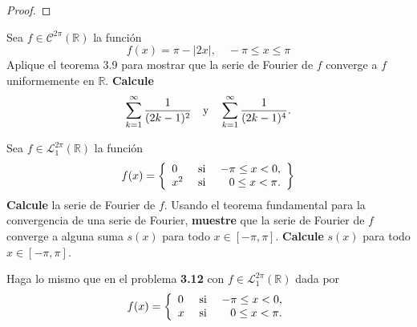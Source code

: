 \documentclass[12pt]{report}
\theoremstyle{largebreak}
\newcommand\abs[1]{\ensuremath{\left|#1\right|}}
\begin{document}
    \begin{proof}
        
    \end{proof}

    \begin{excer}
        Sea $f\in\mathcal{C}^{2\pi}(\mathbb{R})$ la función
        \begin{equation*}
            f(x)=\pi-\abs{2x},\quad-\pi\leq x\leq\pi
        \end{equation*}
        Aplique el teorema 3.9 para mostrar que la serie de Fourier de $f$ converge a $f$ uniformemente en $\mathbb{R}$. \textbf{Calcule}
        \begin{equation*}
            \sum_{ k=1}^\infty\frac{1}{(2k-1)^2}\quad\textup{y}\quad\sum_{ k=1}^\infty\frac{1}{(2k-1)^4}.
        \end{equation*}
    \end{excer}

    \begin{sol}
        
    \end{sol}

    \begin{excer}
        Sea $f\in\mathcal{L}_1^{2\pi}(\mathbb{R})$ la función
        \begin{equation*}
            f(x)=\left\{ 
                \begin{array}{lcr}
                    0 & \textup{ si } & -\pi\leq x<0,\\
                    x^2 & \textup{ si } & 0\leq x<\pi.\\
                \end{array}
            \right\}
        \end{equation*}
        \textbf{Calcule} la serie de Fourier de $f$. Usando el teorema fundamental para la convergencia de una serie de Fourier, \textbf{muestre} que la serie de Fourier de $f$ converge a alguna suma $s(x)$ para todo $x\in[-\pi,\pi]$. \textbf{Calcule} $s(x)$ para todo $x\in[-\pi,\pi]$.
    \end{excer}

    \begin{sol}
        
    \end{sol}

    \begin{excer}
        Haga lo mismo que en el problema \textbf{3.12} con $f\in\mathcal{L}_1^{2\pi}(\mathbb{R})$ dada por
        \begin{equation*}
            f(x)=\left\{ 
                \begin{array}{lcr}
                    0 & \textup{ si } & -\pi\leq x<0,\\
                    x & \textup{ si } & 0\leq x<\pi.\\
                \end{array}
            \right.
        \end{equation*}
    \end{excer}

    \begin{sol}
        
    \end{sol}
\end{document}
